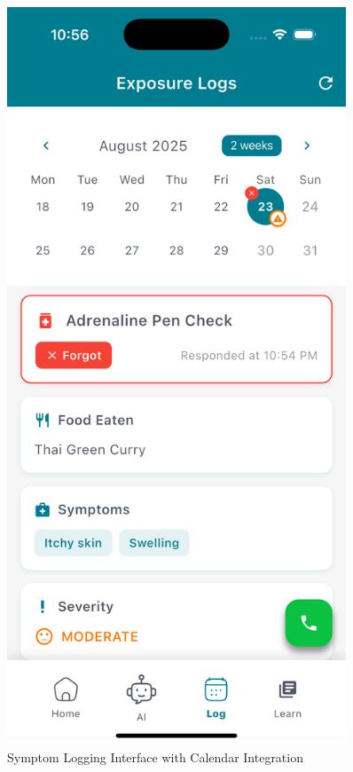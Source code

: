 \documentclass[MScCS]{uccthesis}
\begin{document}
\begin{figure}[htbp]
    \hfill
    \begin{minipage}[b]{0.3\textwidth}
        \centering
        \includegraphics[width=0.9\textwidth,height=0.4\textheight,keepaspectratio]{Figures/symptom_log.png}
    \end{minipage}
    \caption{Symptom Logging Interface with Calendar Integration}
    \label{fig:symptom_log_with_calendar}
\end{figure}
\end{document}
